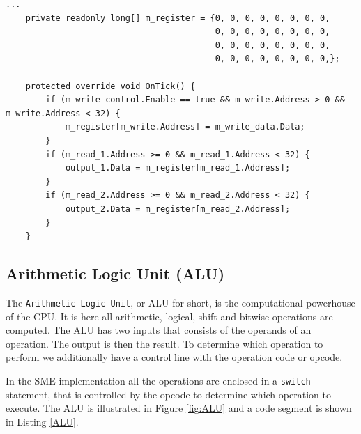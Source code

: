         \begin{minipage}{\linewidth}
            \begin{lstlisting}[language={[Sharp]C}, caption={A slice of the \texttt{register} process SME code. The register is declared as a signed 64-bit array with 32 elements. In every clock cycle the process checks if the write control signal is asserted. If it is, we check if the address to be written lies within the register range and is above 0, as this register is reserved to be hard-wired zero. Lastly the process reads the two specified registers and if they lie within the register range, they get outputted to the corresponding buses.},captionpos=b, label = REGISTER]
...
    private readonly long[] m_register = {0, 0, 0, 0, 0, 0, 0, 0,
                                          0, 0, 0, 0, 0, 0, 0, 0,
                                          0, 0, 0, 0, 0, 0, 0, 0,
                                          0, 0, 0, 0, 0, 0, 0, 0,};
            
    protected override void OnTick() {
        if (m_write_control.Enable == true && m_write.Address > 0 && m_write.Address < 32) {
            m_register[m_write.Address] = m_write_data.Data;          
        }
        if (m_read_1.Address >= 0 && m_read_1.Address < 32) { 
            output_1.Data = m_register[m_read_1.Address];
        }
        if (m_read_2.Address >= 0 && m_read_2.Address < 32) { 
            output_2.Data = m_register[m_read_2.Address];
        }
    }
            \end{lstlisting}
        \end{minipage}  
    
    \subsection{Arithmetic Logic Unit (ALU)}
        The \texttt{Arithmetic Logic Unit}, or ALU for short, is the computational powerhouse of the CPU. It is here all arithmetic, logical, shift and bitwise operations are computed.
        The ALU has two inputs that consists of the operands of an operation. The output is then the result. To determine which operation to perform we additionally have a control line with the operation code or opcode.
        
        In the SME implementation all the operations are enclosed in a \texttt{switch} statement, that is controlled by the opcode to determine which operation to execute. The ALU is illustrated in Figure \ref{fig:ALU} and a code segment is shown in Listing \ref{ALU}.
    
